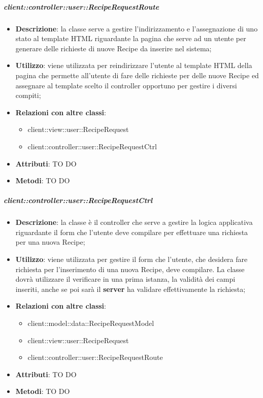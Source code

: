		\subparagraph{client::controller::user::RecipeRequestRoute} %
		\label{subp:bdsm_app_client_controller_user_reciperequestrouteconfig}
			\begin{itemize}
				\item \textbf{Descrizione}: la classe serve a gestire l'indirizzamento e l'assegnazione di uno stato al template HTML riguardante la pagina che serve ad un utente per generare delle richieste di nuove Recipe da inserire nel sistema;
				\item \textbf{Utilizzo}: viene utilizzata per reindirizzare l'utente al template HTML della pagina che permette all'utente di fare delle richieste per delle nuove Recipe ed assegnare al template scelto il controller opportuno per gestire i diversi compiti;
				\item \textbf{Relazioni con altre classi}:
					\begin{itemize}
						\item client::view::user::RecipeRequest
						\item client::controller::user::RecipeRequestCtrl
					\end{itemize}
				\item \textbf{Attributi}: TO DO
				\item \textbf{Metodi}: TO DO
			\end{itemize}

		\subparagraph{client::controller::user::RecipeRequestCtrl} %
		\label{subp:client_controller_user_reciperequestctrl}
			\begin{itemize}
				\item \textbf{Descrizione}: la classe è il controller che serve a gestire la logica applicativa riguardante il form che l'utente deve compilare per effettuare una richiesta per una nuova Recipe;
				\item \textbf{Utilizzo}: viene utilizzata per gestire il form che l'utente, che desidera fare richiesta per l'inserimento di una nuova Recipe, deve compilare. La classe dovrà utilizzare il verificare in una prima istanza, la validità dei campi inseriti, anche se poi sarà il \textbf{server} ha validare effettivamente la richiesta;
				\item \textbf{Relazioni con altre classi}:
					\begin{itemize}
						\item client::model::data::RecipeRequestModel
						\item client::view::user::RecipeRequest
						\item client::controller::user::RecipeRequestRoute
					\end{itemize}
				\item \textbf{Attributi}: TO DO
				\item \textbf{Metodi}: TO DO
			\end{itemize}

